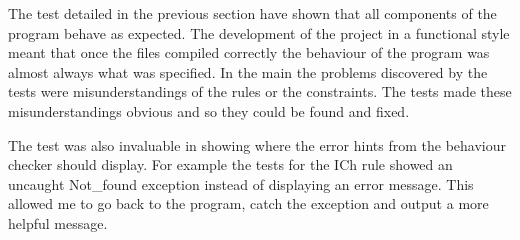 The test detailed in the previous section have shown that all components of the program behave as expected. The development of the project in a functional style meant that once the files compiled correctly the behaviour of the program was almost always what was specified. In the main the problems discovered by the tests were misunderstandings of the rules or the constraints. The tests made these misunderstandings obvious and so they could be found and fixed. 

The test was also invaluable in showing where the error hints from the behaviour checker should display. For example the tests for the ICh rule showed an uncaught Not_found exception instead of displaying an error message. This allowed me to go back to the program, catch the exception and output a more helpful message. 

